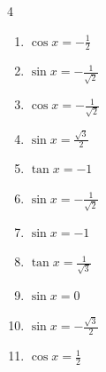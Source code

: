 \begin{multicols}{4}
\begin{enumerate}

  \item $\displaystyle \cos{x}  = -\frac{1}{2}$


  \item $\displaystyle \sin{x}  = -\frac{1}{\sqrt{2}}$


  \item $\displaystyle \cos{x}  = -\frac{1}{\sqrt{2}}$


  \item $\displaystyle \sin{x}  = \frac{\sqrt{3}}{2}$


  \item $\displaystyle \tan{x}  = -1$


  \item $\displaystyle \sin{x}  = -\frac{1}{\sqrt{2}}$


  \item $\displaystyle \sin{x}  = -1$


  \item $\displaystyle \tan{x}  = \frac{1}{\sqrt{3}}$


  \item $\displaystyle \sin{x}  = 0$

        \phantom{$\displaystyle x = 0 , \pi$}

  \item $\displaystyle \sin{x}  = -\frac{\sqrt{3}}{2}$


\columnbreak %

  \item $\displaystyle \cos{x}  = \frac{1}{2}$


\end{enumerate}
\end{multicols}
